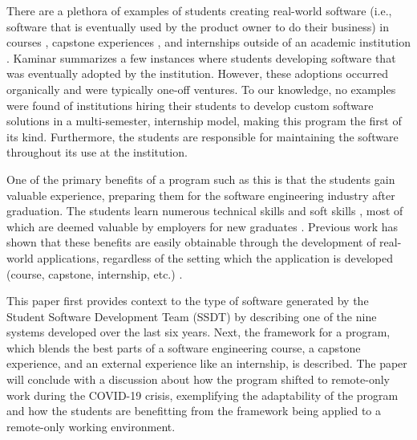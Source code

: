 There are a plethora of examples of students creating real-world software (i.e., software that is eventually used by the product owner to do their business) in courses \cite{tadayon2004software}, capstone experiences \cite{capstone}, and internships outside of an academic institution \cite{rochesterfirstundergradsoftwareteam}. Kaminar \cite{kaminer_2014} summarizes a few instances where students developing software that was eventually adopted by the institution. However, these adoptions occurred organically and were typically one-off ventures. To our knowledge, no examples were found of institutions hiring their students to develop custom software solutions in a multi-semester, internship model, making this program the first of its kind. Furthermore, the students are responsible for maintaining the software throughout its use at the institution.

One of the primary benefits of a program such as this is that the students gain valuable experience, preparing them for the software engineering industry after graduation. The students learn numerous technical skills and soft skills \cite{hardskills}, most of which are deemed valuable by employers for new graduates \cite{lavy2013soft}. Previous work has shown that these benefits are easily obtainable through the development of real-world applications, regardless of the setting which the application is developed (course, capstone, internship, etc.) \cite{heggen2018hiring, liu2005enriching, alzamil2005towards}.

This paper first provides context to the type of software generated by the Student Software Development Team (SSDT) by describing one of the nine systems developed over the last six years. Next, the framework for a program, which blends the best parts of a software engineering course, a capstone experience, and an external experience like an internship, is described. The paper will conclude with a discussion about how the program shifted to remote-only work during the COVID-19 crisis, exemplifying the adaptability of the program and how the students are benefitting from the framework being applied to a remote-only working environment.
